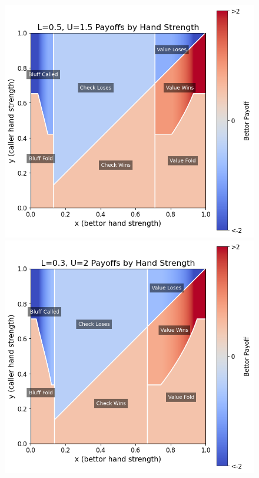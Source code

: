 \documentclass[../../main/main.tex]{subfiles}
\begin{document}
\begin{figure}[p]
\begin{adjustwidth}{-1.25in}{-1.25in}
\begin{minipage}{0.4\textwidth}
        \end{minipage}
        \vspace{0.4cm}\\
        \begin{minipage}{0.4\textwidth}
            \centering
            \includegraphics[width=\textwidth]{images/payoffs_0.5_1.5.png}
        \end{minipage}
        \hspace{0.05\textwidth}
        \begin{minipage}{0.4\textwidth}
            \centering
            \includegraphics[width=\textwidth]{images/payoffs_0.3_2.png}

\end{minipage}
\end{adjustwidth}
\end{figure}
\end{document}
